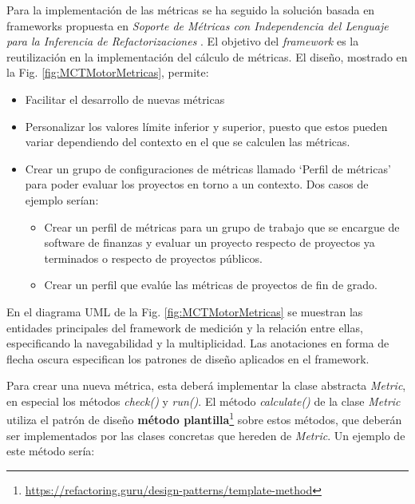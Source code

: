 Para la implementación de las métricas se ha seguido la solución basada en frameworks propuesta en \textit{Soporte de Métricas con Independencia del Lenguaje para la Inferencia de Refactorizaciones} \citep{marticorena_sanchez_soporte_2005}. El objetivo del \textit{framework} es la reutilización en la implementación del cálculo de métricas. El diseño, mostrado en la Fig. \ref{fig:MCTMotorMetricas}, permite:

\begin{itemize}
	\tightlist
	\item Facilitar el desarrollo de nuevas métricas
	\item Personalizar los valores límite inferior y superior, puesto que estos pueden variar dependiendo del contexto en el que se calculen las métricas.
	\item Crear un grupo de configuraciones de métricas llamado `Perfil de métricas' para poder evaluar los proyectos en torno a un contexto. Dos casos de ejemplo serían:
	\begin{itemize}
		\tightlist
		\item Crear un perfil de métricas para un grupo de trabajo que se encargue de software de finanzas y evaluar un proyecto respecto de proyectos ya terminados o respecto de proyectos públicos.
		\item Crear un perfil que evalúe las métricas de proyectos de fin de grado.
	\end{itemize}
\end{itemize}


En el diagrama UML de la Fig. \ref{fig:MCTMotorMetricas} se muestran las entidades principales del framework de medición y la relación entre ellas, especificando la navegabilidad y la multiplicidad. Las anotaciones en forma de flecha oscura especifican los patrones de diseño \citep{gamma_patrones_2002} aplicados en el framework.

Para crear una nueva métrica, esta deberá implementar la clase abstracta \textit{Metric}, en especial los métodos \textit{check()} y \textit{run()}. El método \textit{calculate()} de la clase \textit{Metric} utiliza el patrón de diseño \textbf{método plantilla}\footnote{\url{https://refactoring.guru/design-patterns/template-method}} sobre estos métodos, que deberán ser implementados por las clases concretas que hereden de \textit{Metric}. Un ejemplo de este método sería:

